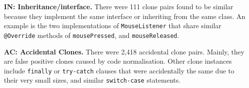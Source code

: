 \documentclass[sigconf,review, anonymous]{acmart}
\begin{document}
\textbf{IN: Inheritance/interface.} There were 111 clone pairs found to be similar because they implement the same interface or inheriting from the same class. An example is the two implementations of {\small{\texttt{MouseListener}}} that share similar {\small\texttt{@Override}} methods of {\small\texttt{mousePressed}}, and {\small\texttt{mouseReleased}}. 

\textbf{AC: Accidental Clones.} There were 2,418 accidental clone pairs. Mainly, they are false positive clones caused by code normalisation. %
Other clone instances include {\small\texttt{finally}} or {\small\texttt{try-catch}} clauses that were accidentally the same due to their very small sizes, and similar {\small\texttt{switch-case}} statements.

\begin{table}
	\centering
	\caption{Classifications of online clone pairs.}
	\label{tab:classification_good_o}
	\small
\end{table}


\end{document}
